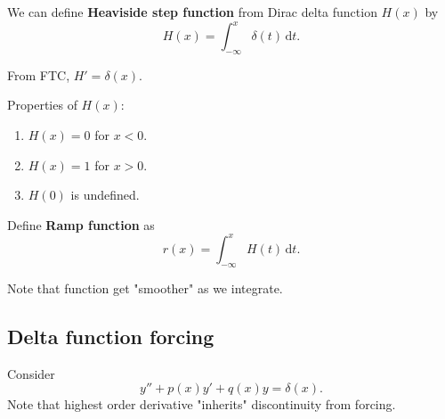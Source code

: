 \documentclass[10pt]{article}
\begin{document}
      \begin{definition}
        We can define \textbf{Heaviside step function} from Dirac delta function $H(x)$ by 
        \begin{equation}\label{eq:heaviside step func}
            H(x)=\int_{-\infty}^{x} \delta(t) \,\mathrm{d}t.
        \end{equation}
      \end{definition}
      From FTC, $ H'=\delta(x) $.

      Properties of $H(x)$:
      \begin{enumerate}
          \item $H(x)=0$ for $x<0$.
          \item $H(x)=1$ for $x>0$.
          \item $ H(0) $ is undefined.
      \end{enumerate}
      \begin{center}
      \end{center}
      \begin{definition}
          Define \textbf{Ramp function} as 
          \[
              r(x)=\int_{-\infty}^{x} H(t) \,\mathrm{d}t
          .\]
      \end{definition}      \begin{center}
      \end{center}
      Note that function get "smoother" as we integrate.
      \subsection{Delta function forcing}
      Consider
      \begin{equation}\label{eq:16.5}
        y''+p(x)y'+q(x)y=\delta(x).
      \end{equation}
      Note that highest order derivative "inherits" discontinuity from forcing.
\end{document}
